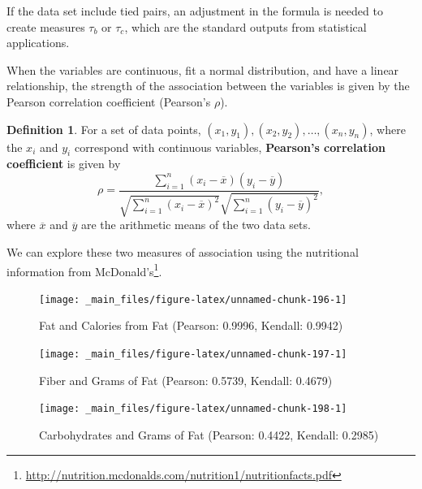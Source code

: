\documentclass[
]{book}
\theoremstyle{definition}
\newtheorem{definition}{Definition}[chapter]
\theoremstyle{definition}
\theoremstyle{definition}
\theoremstyle{definition}
\theoremstyle{remark}
\begin{document}
If the data set include tied pairs, an adjustment in the formula is needed to create measures \(\tau_b\) or \(\tau_c\), which are the standard outputs from statistical applications.

When the variables are continuous, fit a normal distribution, and have a linear relationship, the strength of the association between the variables is given by the Pearson correlation coefficient (Pearson's \(\rho\)).

\begin{definition}
For a set of data points, \((x_1, y_1), (x_2, y_2), \ldots, (x_n,y_n)\), where the \(x_i\) and \(y_i\) correspond with continuous variables, \textbf{Pearson's correlation coefficient} is given by
\[\rho = \frac{ \sum_{i=1}^n (x_i-\overline{x})(y_i-\overline{y})}{\sqrt{\sum_{i=1}^n (x_i-\overline{x})^2} \sqrt{\sum_{i=1}^n (y_i-\overline{y})^2}},\] where \(\overline{x}\) and \(\overline{y}\) are the arithmetic means of the two data sets.
\end{definition}

We can explore these two measures of association using the nutritional information from McDonald's\footnote{\url{http://nutrition.mcdonalds.com/nutrition1/nutritionfacts.pdf}}.

\begin{figure}

{\centering \texttt{[image: \_main\_files/figure-latex/unnamed-chunk-196-1]} 

}

\caption{Fat and Calories from Fat (Pearson: 0.9996, Kendall: 0.9942)}\label{fig:unnamed-chunk-196}
\end{figure}

\begin{figure}

{\centering \texttt{[image: \_main\_files/figure-latex/unnamed-chunk-197-1]} 

}

\caption{Fiber and Grams of Fat (Pearson: 0.5739, Kendall: 0.4679)}\label{fig:unnamed-chunk-197}
\end{figure}

\begin{figure}

{\centering \texttt{[image: \_main\_files/figure-latex/unnamed-chunk-198-1]} 

}

\caption{Carbohydrates and Grams of Fat (Pearson: 0.4422, Kendall: 0.2985)}\label{fig:unnamed-chunk-198}
\end{figure}
\end{document}
